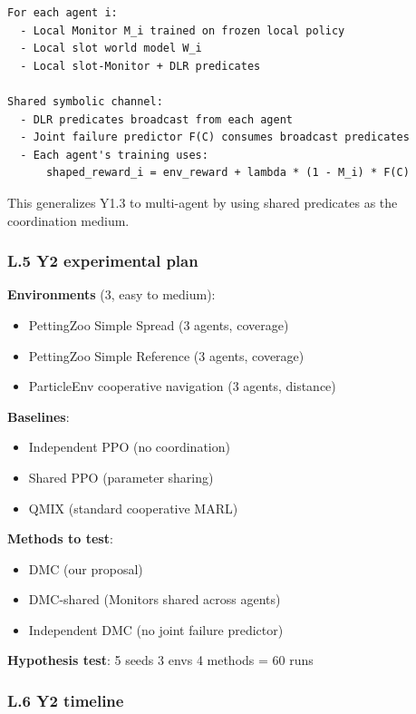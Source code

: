 \documentclass[11pt]{article}
\begin{document}
\begin{verbatim}
For each agent i:
  - Local Monitor M_i trained on frozen local policy
  - Local slot world model W_i
  - Local slot-Monitor + DLR predicates

Shared symbolic channel:
  - DLR predicates broadcast from each agent
  - Joint failure predictor F(C) consumes broadcast predicates
  - Each agent's training uses:
      shaped_reward_i = env_reward + lambda * (1 - M_i) * F(C)
\end{verbatim}

This generalizes Y1.3 to multi-agent by using shared predicates as the
coordination medium.

\subsubsection{L.5 Y2 experimental plan}

\textbf{Environments} (3, easy to medium):
\begin{itemize}
  \item PettingZoo Simple Spread (3 agents, coverage)
  \item PettingZoo Simple Reference (3 agents, coverage)
  \item ParticleEnv cooperative navigation (3 agents, distance)
\end{itemize}


\textbf{Baselines}:
\begin{itemize}
  \item Independent PPO (no coordination)
  \item Shared PPO (parameter sharing)
  \item QMIX (standard cooperative MARL)
\end{itemize}


\textbf{Methods to test}:
\begin{itemize}
  \item DMC (our proposal)
  \item DMC-shared (Monitors shared across agents)
  \item Independent DMC (no joint failure predictor)
\end{itemize}


\textbf{Hypothesis test}: 5 seeds  3 envs  4 methods = 60 runs

\subsubsection{L.6 Y2 timeline}
\end{document}
